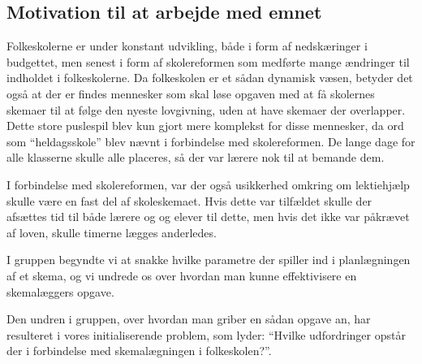 \subsection{Motivation til at arbejde med emnet}
Folkeskolerne er under konstant udvikling, både i form af nedskæringer i budgettet, men senest i form af skolereformen som medførte mange ændringer til indholdet i folkeskolerne. Da folkeskolen er et sådan dynamisk væsen, betyder det også at der er findes mennesker som skal løse opgaven med at få skolernes skemaer til at følge den nyeste lovgivning, uden at have skemaer der overlapper. Dette store puslespil blev kun gjort mere komplekst for disse mennesker, da ord som ``heldagsskole'' blev nævnt i forbindelse med skolereformen. De lange dage for alle klasserne skulle alle placeres, så der var lærere nok til at bemande dem. 

I forbindelse med skolereformen, var der også usikkerhed omkring om lektiehjælp skulle være en fast del af skoleskemaet. Hvis dette var tilfældet skulle der afsættes tid til både lærere og og elever til dette, men hvis det ikke var påkrævet af loven, skulle timerne lægges anderledes. 

I gruppen begyndte vi at snakke hvilke parametre der spiller ind i planlægningen af et skema, og vi undrede os over hvordan man kunne effektivisere en skemalæggers opgave.

Den undren i gruppen, over hvordan man griber en sådan opgave an, har resulteret i vores initialiserende problem, som lyder: ``Hvilke udfordringer opstår der i forbindelse med skemalægningen i folkeskolen?''.

